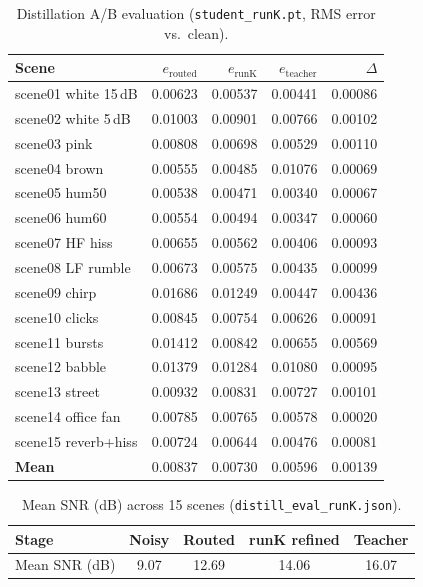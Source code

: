 \begin{table}[H]
  \centering
  \caption{Distillation A/B evaluation (\texttt{student\_runK.pt}, RMS error vs.\ clean).}
  \label{tab:distill_eval}
  \footnotesize
  \setlength{\tabcolsep}{3pt}
  \begin{tabular}{lrrrr}
    \toprule
    \textbf{Scene} & $e_{\mathrm{routed}}$ & $e_{\mathrm{runK}}$ & $e_{\mathrm{teacher}}$ & $\Delta$ \\
    \midrule
    scene01 white 15\,dB  & 0.00623 & 0.00537 & 0.00441 & 0.00086 \\
    scene02 white 5\,dB   & 0.01003 & 0.00901 & 0.00766 & 0.00102 \\
    scene03 pink          & 0.00808 & 0.00698 & 0.00529 & 0.00110 \\
    scene04 brown         & 0.00555 & 0.00485 & 0.01076 & 0.00069 \\
    scene05 hum50         & 0.00538 & 0.00471 & 0.00340 & 0.00067 \\
    scene06 hum60         & 0.00554 & 0.00494 & 0.00347 & 0.00060 \\
    scene07 HF hiss       & 0.00655 & 0.00562 & 0.00406 & 0.00093 \\
    scene08 LF rumble     & 0.00673 & 0.00575 & 0.00435 & 0.00099 \\
    scene09 chirp         & 0.01686 & 0.01249 & 0.00447 & 0.00436 \\
    scene10 clicks        & 0.00845 & 0.00754 & 0.00626 & 0.00091 \\
    scene11 bursts        & 0.01412 & 0.00842 & 0.00655 & 0.00569 \\
    scene12 babble        & 0.01379 & 0.01284 & 0.01080 & 0.00095 \\
    scene13 street        & 0.00932 & 0.00831 & 0.00727 & 0.00101 \\
    scene14 office fan    & 0.00785 & 0.00765 & 0.00578 & 0.00020 \\
    scene15 reverb+hiss   & 0.00724 & 0.00644 & 0.00476 & 0.00081 \\
    \midrule
    \textbf{Mean}         & 0.00837 & 0.00730 & 0.00596 & 0.00139 \\
    \bottomrule
  \end{tabular}
\end{table}

\begin{table}[H]
  \centering
  \caption{Mean SNR (dB) across 15 scenes (\texttt{distill\_eval\_runK.json}).}
  \label{tab:distill_snr}
  \begin{tabular}{lcccc}
    \toprule
    \textbf{Stage} & Noisy & Routed & runK refined & Teacher \\
    \midrule
    Mean SNR (dB) & 9.07 & 12.69 & 14.06 & 16.07 \\
    \bottomrule
  \end{tabular}
\end{table}

